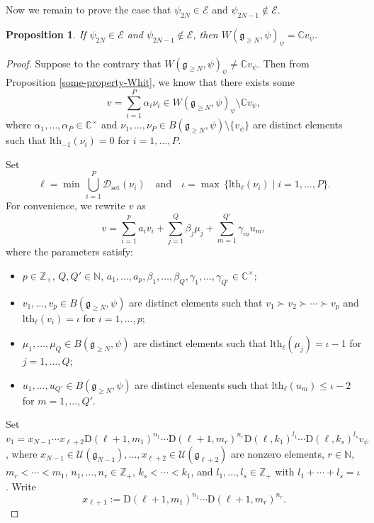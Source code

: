 \documentclass[12pt, a4paper]{amsart}
\newcommand{\fg}{\mathfrak g}
\newcommand{\C}{\mathbb{C}}
\newcommand{\N}{\mathbb N}
\newcommand{\Z}{\mathbb Z}
\newcommand{\rD}{\mathrm{D}}
\newcommand{\U}{\mathcal{U}}
\theoremstyle{Theorem}
\theoremstyle{Theorem}
\newtheorem{proposition}[thm]{Proposition}
\numberwithin{equation}{section}
\begin{document}
Now we remain to prove the case that $\psi_{2N}\in\mathcal{E}$ and $\psi_{2N-1}\notin\mathcal{E}$.
\begin{proposition}\label{EXP-2N-1}
If $\psi_{2N}\in\mathcal{E}$ and $\psi_{2N-1}\notin\mathcal{E}$, then $W(\fg_{\geq N},\psi)_{\psi}=\C v_{\psi}$.
\end{proposition}
\begin{proof}
Suppose to the contrary that $W(\fg_{\geq N},\psi)_{\psi}\neq\C v_{\psi}$.
Then from Proposition \ref{some-property-Whit}, we know that
there exists some \[v=\sum_{i=1}^{P}\alpha_{i}\nu_{i}\in W(\fg_{\geq N},\psi)_{\psi}\setminus \C v_{\psi},\]
where $\alpha_{1},\dots,\alpha_{P}\in\C^{\times}$ and $\nu_{1},\dots,\nu_{P}\in B(\fg_{\geq N},\psi)\setminus\{v_{\psi}\}$
are distinct elements such that $\mathrm{lth}_{-1}(\nu_{i})=0$ for $i=1,\dots,P$.

Set \[\ell=\min\,\bigcup_{i=1}^{P}\mathcal{D}_{\mathrm{set}}(\nu_{i})\quad \text{and}\quad
\iota=\max\,\{\mathrm{lth}_{\ell}(\nu_{i})\mid i=1,\dots,P\}.\]
For convenience, we rewrite $v$ as
\[v=\sum_{i=1}^{p}a_{i}v_{i}+\sum_{j=1}^{Q}\beta_{j}\mu_{j}+\sum_{m=1}^{Q'}\gamma_{m}u_{m},\]
where the parameters satisfy:
\begin{itemize}
\item $p\in\Z_{+}$, $Q,Q'\in\N$, $a_{1},\dots,a_{p},\beta_{1},\dots,\beta_{Q},\gamma_{1},\dots,\gamma_{Q'}\in\C^{\times}$;
\item $v_{1},\dots,v_{p}\in B(\fg_{\geq N},\psi)$ are distinct elements such that $v_{1}\succ v_{2}\succ\cdots\succ v_{p}$
and $\mathrm{lth}_{\ell}(v_{i})=\iota$ for $i=1,\dots,p$;
\item $\mu_{1},\dots,\mu_{Q}\in B(\fg_{\geq N},\psi)$ are distinct elements
such that $\mathrm{lth}_{\ell}(\mu_{j})=\iota-1$ for $j=1,\dots,Q$;
\item $u_{1},\dots,u_{Q'}\in B(\fg_{\geq N},\psi)$ are distinct elements
such that $\mathrm{lth}_{\ell}(u_{m})\leq\iota-2$ for $m=1,\dots,Q'$.
\end{itemize}
Set $v_{1}=x_{N-1}\cdots x_{\ell+2}\rD(\ell+1,m_{1})^{n_{1}}\cdots\rD(\ell+1,m_{r})^{n_{r}}
\rD(\ell,k_{1})^{l_{1}}\cdots\rD(\ell,k_{s})^{l_{s}}v_{\psi}$,
where $x_{N-1}\in\U(\fg_{N-1}),\dots,x_{\ell+2}\in\U(\fg_{\ell+2})$ are nonzero elements, $r\in\N$,
$m_{r}<\cdots<m_{1}$, $n_{1},\dots,n_{r}\in\Z_{+}$, $k_{s}<\cdots<k_{1}$,
and $l_{1},\dots,l_{s}\in\Z_{+}$ with $l_{1}+\cdots+l_{s}=\iota$.
Write \[x_{\ell+1}:=\rD(\ell+1,m_{1})^{n_{1}}\cdots\rD(\ell+1,m_{r})^{n_{r}}.\]


\end{proof}
\end{document}
